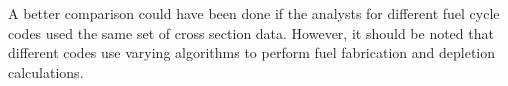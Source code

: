 \documentclass{article}
\begin{document}
A better comparison could have been done if the analysts for different fuel cycle
codes used the same set of cross section data. However, it should be noted that
different codes use varying algorithms to perform fuel fabrication and depletion
calculations.




\end{document}
